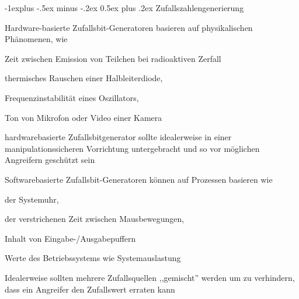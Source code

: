 \documentclass[a4paper]{article}
\makeatletter
\renewcommand{\subsection}{\@startsection{subsection}{2}{0mm}%
 {-1explus -.5ex minus -.2ex}%
 {0.5ex plus .2ex}%
 {\normalfont\normalsize\bfseries}}
\makeatother
\begin{document}
\begin{multicols}{3}
      \subsection{Zufallszahlengenerierung}
      \begin{itemize*}
            \item Hardware-basierte Zufallsbit-Generatoren basieren auf physikalischen Phänomenen, wie
            \begin{itemize*}
                  \item Zeit zwischen Emission von Teilchen bei radioaktiven Zerfall
                  \item thermisches Rauschen einer Halbleiterdiode,
                  \item Frequenzinstabilität eines Oszillators,
                  \item Ton von Mikrofon oder Video einer Kamera
            \end{itemize*}
            \item hardwarebasierte Zufallsbitgenerator sollte idealerweise in einer manipulationssicheren Vorrichtung untergebracht und so vor möglichen Angreifern geschützt sein
            \item Softwarebasierte Zufallsbit-Generatoren können auf Prozessen basieren wie
            \begin{itemize*}
                  \item der Systemuhr,
                  \item der verstrichenen Zeit zwischen Mausbewegungen,
                  \item Inhalt von Eingabe-/Ausgabepuffern
                  \item Werte des Betriebssystems wie Systemauslastung %
            \end{itemize*}
            \item Idealerweise sollten mehrere Zufallsquellen ,,gemischt'' werden um zu verhindern, dass ein Angreifer den Zufallswert erraten kann

\end{itemize*}
\end{multicols}
\end{document}
